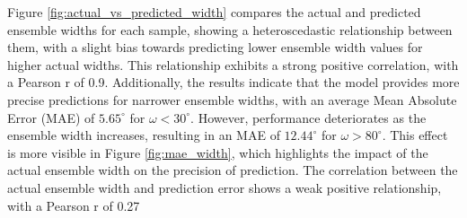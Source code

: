 \documentclass[11pt]{article}
\begin{document}
Figure \ref{fig:actual_vs_predicted_width} compares the actual and predicted ensemble widths for each sample, showing a heteroscedastic relationship between them, with a slight bias towards predicting lower ensemble width values for higher actual widths. This relationship exhibits a strong positive correlation, with a Pearson r of 0.9. Additionally, the results indicate that the model provides more precise predictions for narrower ensemble widths, with an average Mean Absolute Error (MAE) of $5.65^\circ$ for $\omega < 30^\circ$. However, performance deteriorates as the ensemble width increases, resulting in an MAE of $12.44^\circ$ for $\omega > 80^\circ$. This effect is more visible in Figure \ref{fig:mae_width}, which highlights the impact of the actual ensemble width on the precision of prediction. The correlation between the actual ensemble width and prediction error shows a weak positive relationship, with a Pearson r of 0.27
\end{document}

